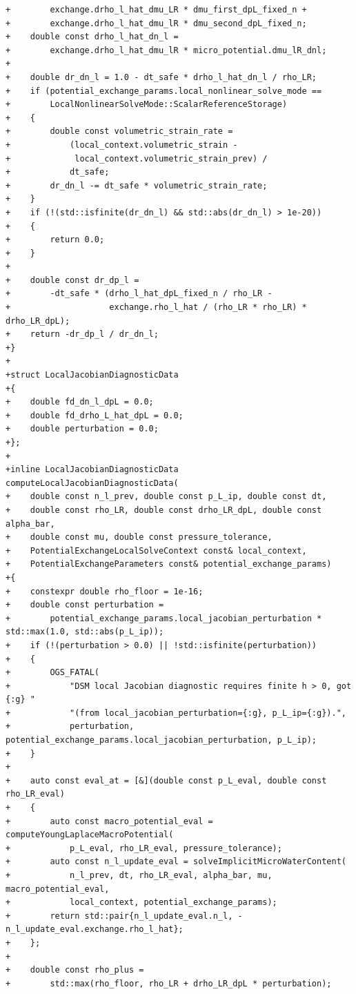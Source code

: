 \documentclass[10pt]{article}
\begin{document}
\begin{lstlisting}
+        exchange.drho_l_hat_dmu_LR * dmu_first_dpL_fixed_n +
+        exchange.drho_l_hat_dmu_lR * dmu_second_dpL_fixed_n;
+    double const drho_l_hat_dn_l =
+        exchange.drho_l_hat_dmu_lR * micro_potential.dmu_lR_dnl;
+
+    double dr_dn_l = 1.0 - dt_safe * drho_l_hat_dn_l / rho_LR;
+    if (potential_exchange_params.local_nonlinear_solve_mode ==
+        LocalNonlinearSolveMode::ScalarReferenceStorage)
+    {
+        double const volumetric_strain_rate =
+            (local_context.volumetric_strain -
+             local_context.volumetric_strain_prev) /
+            dt_safe;
+        dr_dn_l -= dt_safe * volumetric_strain_rate;
+    }
+    if (!(std::isfinite(dr_dn_l) && std::abs(dr_dn_l) > 1e-20))
+    {
+        return 0.0;
+    }
+
+    double const dr_dp_l =
+        -dt_safe * (drho_l_hat_dpL_fixed_n / rho_LR -
+                    exchange.rho_l_hat / (rho_LR * rho_LR) * drho_LR_dpL);
+    return -dr_dp_l / dr_dn_l;
+}
+
+struct LocalJacobianDiagnosticData
+{
+    double fd_dn_l_dpL = 0.0;
+    double fd_drho_L_hat_dpL = 0.0;
+    double perturbation = 0.0;
+};
+
+inline LocalJacobianDiagnosticData computeLocalJacobianDiagnosticData(
+    double const n_l_prev, double const p_L_ip, double const dt,
+    double const rho_LR, double const drho_LR_dpL, double const alpha_bar,
+    double const mu, double const pressure_tolerance,
+    PotentialExchangeLocalSolveContext const& local_context,
+    PotentialExchangeParameters const& potential_exchange_params)
+{
+    constexpr double rho_floor = 1e-16;
+    double const perturbation =
+        potential_exchange_params.local_jacobian_perturbation * std::max(1.0, std::abs(p_L_ip));
+    if (!(perturbation > 0.0) || !std::isfinite(perturbation))
+    {
+        OGS_FATAL(
+            "DSM local Jacobian diagnostic requires finite h > 0, got {:g} "
+            "(from local_jacobian_perturbation={:g}, p_L_ip={:g}).",
+            perturbation, potential_exchange_params.local_jacobian_perturbation, p_L_ip);
+    }
+
+    auto const eval_at = [&](double const p_L_eval, double const rho_LR_eval)
+    {
+        auto const macro_potential_eval = computeYoungLaplaceMacroPotential(
+            p_L_eval, rho_LR_eval, pressure_tolerance);
+        auto const n_l_update_eval = solveImplicitMicroWaterContent(
+            n_l_prev, dt, rho_LR_eval, alpha_bar, mu, macro_potential_eval,
+            local_context, potential_exchange_params);
+        return std::pair{n_l_update_eval.n_l, -n_l_update_eval.exchange.rho_l_hat};
+    };
+
+    double const rho_plus =
+        std::max(rho_floor, rho_LR + drho_LR_dpL * perturbation);

\end{lstlisting}
\end{document}

